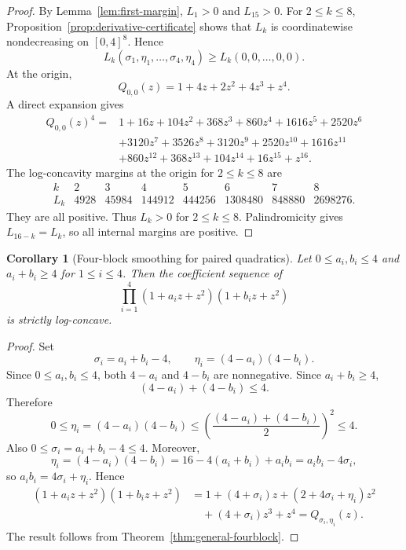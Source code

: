 \documentclass[11pt]{amsart}
\newtheorem{corollary}[theorem]{Corollary}
\begin{document}
\begin{proof}
By Lemma~\ref{lem:first-margin}, \(L_1>0\) and \(L_{15}>0\).  For \(2\le k\le8\), Proposition~\ref{prop:derivative-certificate} shows that \(L_k\) is coordinatewise nondecreasing on \([0,4]^8\).  Hence
\[
        L_k(\sigma_1,\eta_1,\ldots,\sigma_4,\eta_4)
        \ge L_k(0,0,\ldots,0,0).
\]
At the origin,
\[
        Q_{0,0}(z)=1+4z+2z^2+4z^3+z^4.
\]
A direct expansion gives
\[
\begin{aligned}
        Q_{0,0}(z)^4
        ={}&1+16z+104z^2+368z^3+860z^4+1616z^5+2520z^6 \\
        &+3120z^7+3526z^8+3120z^9+2520z^{10}+1616z^{11} \\
        &+860z^{12}+368z^{13}+104z^{14}+16z^{15}+z^{16}.
\end{aligned}
\]
The log-concavity margins at the origin for \(2\le k\le8\) are
\[
\begin{array}{c|ccccccc}
 k&2&3&4&5&6&7&8\\
\hline
 L_k&4928&45984&144912&444256&1308480&848880&2698276.
\end{array}
\]
They are all positive.  Thus \(L_k>0\) for \(2\le k\le8\).  Palindromicity gives \(L_{16-k}=L_k\), so all internal margins are positive.
\end{proof}

\begin{corollary}[Four-block smoothing for paired quadratics]\label{cor:fourblock-paired}
Let \(0\le a_i,b_i\le4\) and \(a_i+b_i\ge4\) for \(1\le i\le4\).  Then the coefficient sequence of
\[
        \prod_{i=1}^4(1+a_i z+z^2)(1+b_i z+z^2)
\]
is strictly log-concave.
\end{corollary}

\begin{proof}
Set
\[
        \sigma_i=a_i+b_i-4,
        \qquad
        \eta_i=(4-a_i)(4-b_i).
\]
Since \(0\le a_i,b_i\le4\), both \(4-a_i\) and \(4-b_i\) are nonnegative.  Since \(a_i+b_i\ge4\),
\[
        (4-a_i)+(4-b_i)\le4.
\]
Therefore
\[
        0\le \eta_i=(4-a_i)(4-b_i)
        \le \left(\frac{(4-a_i)+(4-b_i)}2\right)^2
        \le4.
\]
Also \(0\le\sigma_i=a_i+b_i-4\le4\).  Moreover,
\[
        \eta_i=(4-a_i)(4-b_i)=16-4(a_i+b_i)+a_ib_i=a_ib_i-4\sigma_i,
\]
so \(a_ib_i=4\sigma_i+
\eta_i\).  Hence
\[
\begin{aligned}
(1+a_iz+z^2)(1+b_iz+z^2)
&=1+(4+\sigma_i)z+(2+4\sigma_i+\eta_i)z^2 \\
&\quad +(4+\sigma_i)z^3+z^4
=Q_{\sigma_i,\eta_i}(z).
\end{aligned}
\]
The result follows from Theorem~\ref{thm:general-fourblock}.
\end{proof}
\end{document}
